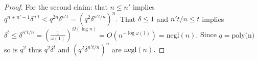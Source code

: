\documentclass[11pt]{article}
\newcommand{\poly}[2]{{#1}^{<#2}[x]}
\newcommand{\negl}[1]{\text{negl}(#1)}
\newtheorem{lemma}{Lemma}[section]
\begin{document}
\begin{proof}


For the second claim: that $n\leq n'$ implies $q^{n+n'-1} \delta^{n't} < q^{2n} \delta^{n't} = (q^2 \delta ^{n't/n})^n. $ That $\delta \leq 1$ and $n't/n \leq t$ implies $\delta^{t} \leq\delta^{n't/n} = (\frac{1}{\omega(1)})^{\Omega(\log n)} = O( n^{-\log \omega(1)})= \negl{n}.$ Since $q=\text{poly(n)}$ so is $q^2$ thus $q^2 \delta^t$ and $(q^2\delta^{n't/n})^n$ are $\negl{n}.$ 
\end{proof} 
\end{document}
